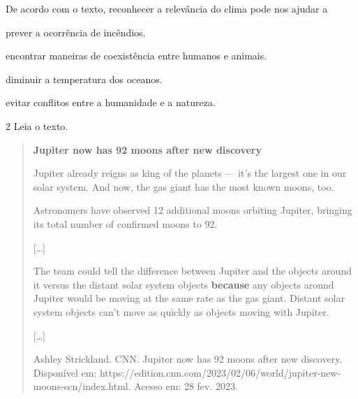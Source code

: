 De acordo com o texto, reconhecer a relevância do clima pode nos ajudar a

\begin{escolha}
\item prever a ocorrência de incêndios.

\item encontrar maneiras de coexistência entre humanos e animais.

\item diminuir a temperatura dos oceanos.

\item evitar conflitos entre a humanidade e a natureza.
\end{escolha}


\num{2} Leia o texto.

\begin{quote}
\textbf{Jupiter now has 92 moons after new discovery}

Jupiter already reigns as king of the planets --- it's the largest one
in our solar system. And now, the gas giant has the most known moons,
too.

Astronomers have observed 12 additional moons orbiting Jupiter, bringing
its total number of confirmed moons to 92.

{[}\ldots{}{]}

The team could tell the difference between Jupiter and the objects
around it versus the distant solar system objects \textbf{because} any
objects around Jupiter would be moving at the same rate as the gas
giant. Distant solar system objects can't move as quickly as objects
moving with Jupiter.

{[}\ldots{}{]}

Ashley Strickland. CNN. Jupiter now has 92 moons after new discovery.
Disponível em:
https://edition.cnn.com/2023/02/06/world/jupiter-new-moons-scn/index.html.
Acesso em: 28 fev. 2023.
\end{quote}

